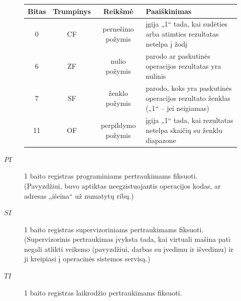 \begin{description}
\begin{description}
        \begin{tabularx}{0.85\textwidth}{|c|c|c|X|}
          \hline
          Bitas & Trumpinys & Reikšmė & Paaiškinimas %
          \\
          \hline
          0 & CF & pernešimo požymis & įgija „1“ tada, kai sudėties arba
          atimties rezultatas netelpa į žodį 
          \\
          \hline
          6 & ZF & nulio požymis & parodo ar paskutinės operacijos 
          rezultatas yra nulinis %
          \\
          \hline
          7 & SF & ženklo požymis & parodo, koks yra paskutinės operacijos 
          rezultato ženklas („1“ – jei neigiamas) 
          \\
          \hline
          11 & OF & perpildymo požymis & įgija „1“ tada, kai rezultatas
          netelpa skaičių su ženklu diapazone 
          \\
          \hline
        \end{tabularx}
      \item[$PI$] 1 baito registras programiniams pertraukimams fiksuoti.
        (Pavyzdžiui, buvo aptiktas neegzistuojantis operacijos kodas, ar
        adresas „išeina“ už numatytų ribų.)
      \item[$SI$] 1 baito registras supervizoriniams pertraukimams fiksuoti.
        (Supervizorinis pertraukimas įvyksta tada, kai virtuali mašina
        pati negali atlikti veiksmo (pavyzdžiui, darbas su įvedimu ir
        išvedimu) ir ji kreipiasi į operacinės sistemos servisą.)
      \item[$TI$] 1 baito registras laikrodžio pertraukimams fiksuoti.

\end{description}
\end{description}
